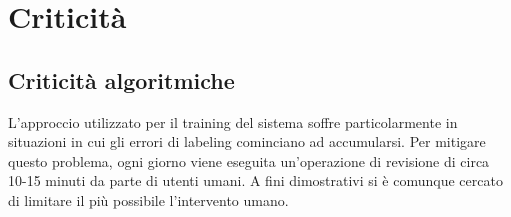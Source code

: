\section{Criticità}

\subsection{Criticità algoritmiche}
L'approccio utilizzato per il training del sistema soffre particolarmente in situazioni in cui gli errori di labeling cominciano ad accumularsi. Per mitigare questo problema, ogni giorno viene eseguita un'operazione di revisione di circa 10-15 minuti da parte di utenti umani. A fini dimostrativi si è comunque cercato di limitare il più possibile l'intervento umano\cite{TowardAnArchitecture:online}.

\newpage